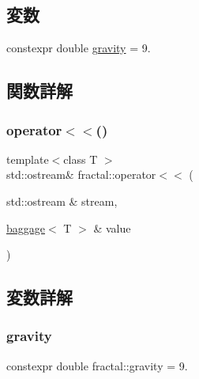 \subsection*{変数}
\begin{DoxyCompactItemize}
\item 
constexpr double \hyperlink{namespacefractal_aa98984c2091bb576a2063ed295e024f7}{gravity} = 9.
\end{DoxyCompactItemize}


\subsection{関数詳解}
\mbox{\label{namespacefractal_abe8d2436bc90b6911384070a496cc49a}} 
\subsubsection{\texorpdfstring{operator$<$$<$()}{operator<<()}}
{\footnotesize\ttfamily template$<$class T $>$ \\
std\+::ostream\& fractal\+::operator$<$$<$ (\begin{DoxyParamCaption}\item[{std\+::ostream \&}]{stream,  }\item[{\hyperlink{classfractal_1_1baggage}{baggage}$<$ T $>$ \&}]{value }\end{DoxyParamCaption})}



\subsection{変数詳解}
\mbox{\label{namespacefractal_aa98984c2091bb576a2063ed295e024f7}} 
\subsubsection{\texorpdfstring{gravity}{gravity}}
{\footnotesize\ttfamily constexpr double fractal\+::gravity = 9.}

